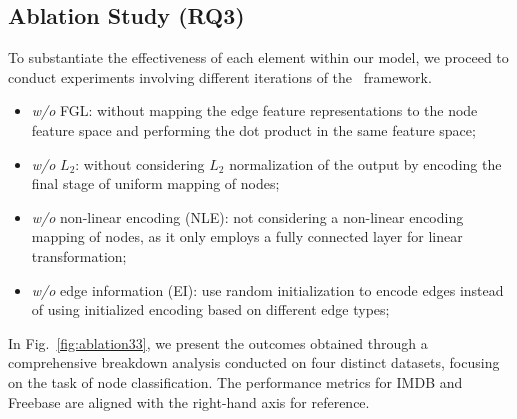 \subsection{Ablation Study (\textbf{RQ3})} \label{sec:ablation}
To substantiate the effectiveness of each element within our model, we proceed to conduct experiments involving different iterations of the \alg~framework.
\begin{itemize}[leftmargin=*]
    \item \emph{w/o} FGL: without mapping the edge feature representations to the node feature space and performing the dot product in the same feature space; 
    \item \emph{w/o} $L_{2}$: without considering $L_{2}$ normalization of the output by encoding the final stage of uniform mapping of nodes; 
    \item \emph{w/o} non-linear encoding (NLE): not considering a non-linear encoding mapping of nodes, as it only employs a fully connected layer for linear transformation; 
    \item \emph{w/o} edge information (EI): use random initialization to encode edges instead of using initialized encoding based on different edge types;
\end{itemize}
In Fig.~\ref{fig:ablation33}, we present the outcomes obtained through a comprehensive breakdown analysis conducted on four distinct datasets, focusing on the task of node classification. 
The performance metrics for IMDB and Freebase are aligned with the right-hand axis for reference.

